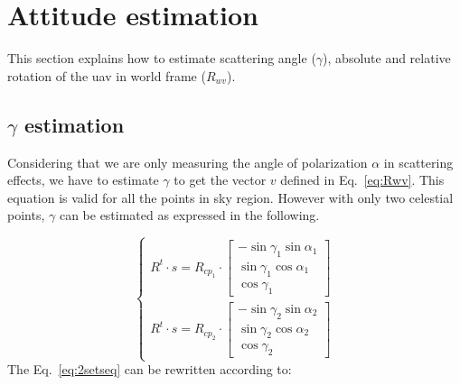 \graphicspath{{./content/intro/figures/}}

\section{Attitude estimation}
\label{sec:g-abs-rel}
This section explains how to estimate scattering angle ($\gamma$), absolute and
relative rotation of the \gls{uav} in world frame ($R_{wv}$).

\subsection{$\gamma$ estimation}
\label{sec:gamma}
Considering that we are only measuring the angle of polarization $\alpha$
in scattering effects, we have to estimate $\gamma$ to get the vector
$v$ defined in Eq.~\ref{eq:Rwv}. This equation is valid for all the points in
sky region. However with only two celestial points, $\gamma$ can be estimated as
expressed in the following.

\begin{equation}
\begin{cases}
R^{t}\cdot s=R_{cp_{1}}\cdot\left[\begin{array}{c}
-\sin\gamma_{1}\sin\alpha_{1}\\
\sin\gamma_{1}\cos\alpha_{1}\\
\cos\gamma_{1}
\end{array}\right]\\
R^{t}\cdot s=R_{cp_{2}}\cdot\left[\begin{array}{c}
-\sin\gamma_{2}\sin\alpha_{2}\\
\sin\gamma_{2}\cos\alpha_{2}\\
\cos\gamma_{2}
\end{array}\right]
\end{cases}\label{eq:2setseq}
\end{equation}
\noindent The Eq.~\ref{eq:2setseq} can be rewritten according to:


